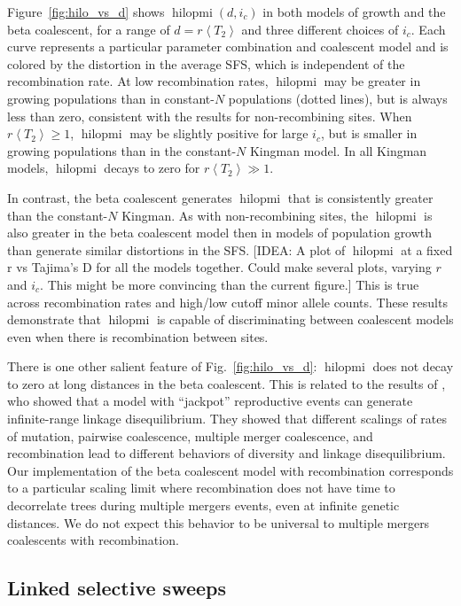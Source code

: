 \documentclass[11pt, letterpaper]{article}   	%
\newcommand{\fig}[1]{Fig.~\ref{#1}}
\newcommand{\Fig}[1]{Figure~\ref{#1}}
\newcommand{\E}[1]{\left< #1 \right>}
\DeclareMathOperator{\hilopmi}{hilopmi}
\begin{document}
\Fig{fig:hilo_vs_d} shows $\hilopmi(d,i_c)$ in both models of growth and the beta coalescent, for a range of $d=r\E{T_2}$ and three different choices of $i_c$.
Each curve represents a particular parameter combination and coalescent model and is colored by the distortion in the average SFS, which is independent of the recombination rate.
At low recombination rates, $\hilopmi$ may be greater in growing populations than in constant-$N$ populations (dotted lines), but is always less than zero, consistent with the results for non-recombining sites.
When $r\E{T_2}\geq 1$, $\hilopmi$ may be slightly positive for large $i_c$, but is smaller in growing populations than in the constant-$N$ Kingman model.
In all Kingman models, $\hilopmi$ decays to zero for $r\E{T_2}\gg 1$.

In contrast, the beta coalescent generates $\hilopmi$ that is consistently greater than the constant-$N$ Kingman.
As with non-recombining sites, the $\hilopmi$ is also greater in the beta coalescent model then in models of population growth than generate similar distortions in the SFS.
[IDEA: A plot of $\hilopmi$ at a fixed r vs Tajima's D for all the models together. Could make several plots, varying $r$ and $i_c$. This might be more convincing than the current figure.]
This is true across recombination rates and high/low cutoff minor allele counts.
These results demonstrate that $\hilopmi$ is capable of discriminating between coalescent models even when there is recombination between sites.

There is one other salient feature of \fig{fig:hilo_vs_d}: $\hilopmi$ does not decay to zero at long distances in the beta coalescent.
This is related to the results of \cite{EldonWakeley20??}, who showed that a model with ``jackpot'' reproductive events can generate infinite-range linkage disequilibrium.
They showed that different scalings of rates of mutation, pairwise coalescence, multiple merger coalescence, and recombination lead to different behaviors of diversity and linkage disequilibrium.
Our implementation of the beta coalescent model with recombination corresponds to a particular scaling limit where recombination does not have time to decorrelate trees during multiple mergers events, even at infinite genetic distances.
We do not expect this behavior to be universal to multiple mergers coalescents with recombination.

\subsection*{Linked selective sweeps}
\end{document}
